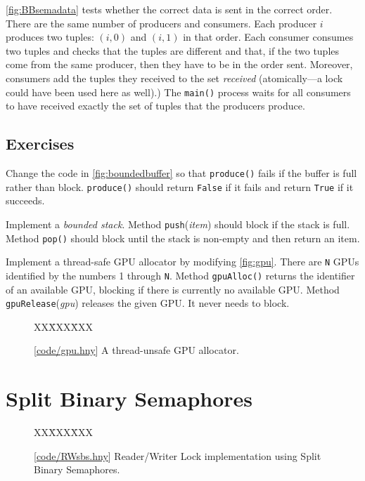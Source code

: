 \documentclass{report}
\newcommand{\harmonysource}[1]{
\begin{tabbing}
XX\=XXX\=XXX\kill
    
\end{tabbing}
}
\newcommand{\harmonylink}[1]{%
[\href{https://www.cs.cornell.edu/home/rvr/harmony/#1}{\underline{#1}}]%
}
\newenvironment{code}{
\tcolorbox
}{
\endtcolorbox
}
\begin{document}
\autoref{fig:BBsemadata} tests whether the correct data is sent in
the correct order.  There are the same number of producers and consumers.
Each producer $i$ produces two tuples: $(i, 0)$ and $(i, 1)$ in that order.
Each consumer consumes two tuples and checks that the tuples are different
and that, if the two tuples come from the same producer, then they have to
be in the order sent.
Moreover, consumers add the tuples they received to the set
\textit{received} (atomically---a lock could have been used here as well).)
The \texttt{main()} process waits for all consumers to have received
exactly the set of tuples that the producers produce.

\section*{Exercises}
\begin{problems}
\item Change the code in \autoref{fig:boundedbuffer} so that
\texttt{produce()} fails if the buffer is full rather than block.
\texttt{produce()} should return \texttt{False} if it fails
and return \texttt{True} if it succeeds.
\item Implement a \emph{bounded stack}.  Method \texttt{push}(\textit{item})
should block if the stack is full.  Method \texttt{pop()} should block
until the stack is non-empty and then return an item.
\item \label{ex:gpu} Implement a thread-safe GPU allocator by modifying
\autoref{fig:gpu}.
There are \texttt{N} GPUs identified by the numbers
1 through \texttt{N}.  Method \texttt{gpuAlloc()} returns the identifier
of an available GPU, blocking if there is currently no available GPU.
Method \texttt{gpuRelease}(\textit{gpu}) releases the given GPU.  It never needs
to block.
\end{problems}

\begin{figure}
\begin{code}
\harmonysource{gpu}
\end{code}
\caption{\harmonylink{code/gpu.hny} A thread-unsafe GPU allocator.}
\label{fig:gpu}
\end{figure}

\chapter{Split Binary Semaphores}
\label{ch:sbs}
%

\begin{figure}
\begin{code}
\harmonysource{RWsbs}
\end{code}
\caption{\harmonylink{code/RWsbs.hny} Reader/Writer Lock implementation using Split Binary Semaphores.}
\label{fig:RWsplitsema}
\end{figure}
\end{document}
